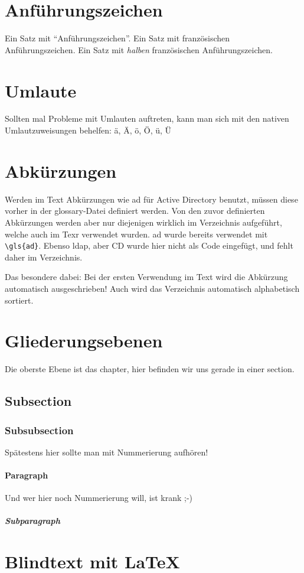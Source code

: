\section{Anführungszeichen}
Ein Satz mit "`Anführungszeichen"'.
Ein Satz mit französischen \frqq Anführungszeichen\flqq.
Ein Satz mit \textit{halben} französischen \frq Anführungszeichen\flq.


\section{Umlaute}
Sollten mal Probleme mit Umlauten auftreten, kann man sich mit den nativen Umlautzuweisungen behelfen:
\"a, \"A, \"o, \"O, \"u, \"U


\section{Abkürzungen}
Werden im Text Abkürzungen wie \gls{ad} für Active Directory benutzt, müssen diese vorher in der glossary-Datei definiert werden.
Von den zuvor definierten Abkürzungen werden aber nur diejenigen wirklich im Verzeichnis aufgeführt, welche auch im Texr verwendet wurden.
\gls{ad} wurde bereits verwendet mit \verb+\gls{ad}+. Ebenso \gls{ldap}, aber CD wurde hier nicht als Code eingefügt, und fehlt daher im Verzeichnis.

Das besondere dabei: Bei der ersten Verwendung im Text wird die Abkürzung automatisch ausgeschrieben! Auch wird das Verzeichnis automatisch alphabetisch sortiert.


\section{Gliederungsebenen}
Die oberste Ebene ist das chapter, hier befinden wir uns gerade in einer section.
\subsection{Subsection}
\subsubsection{Subsubsection}
Spätestens hier sollte man mit Nummerierung aufhören!
\paragraph{Paragraph}
Und wer hier noch Nummerierung will, ist krank ;-)
\subparagraph{Subparagraph}

\section{Blindtext mit \LaTeX}
\lipsum